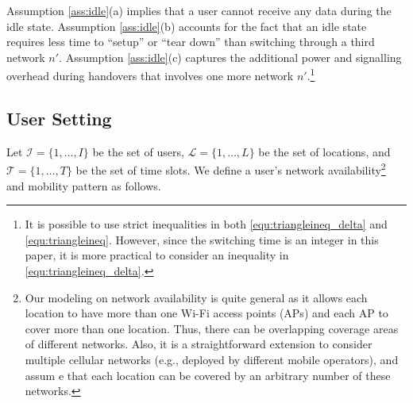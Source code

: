 \documentclass[journal]{IEEEtran}
\begin{document}
 Assumption \ref{ass:idle}(a) implies that a user cannot receive any data during the idle state. 
 Assumption \ref{ass:idle}(b) accounts for the fact that an idle state requires less time to ``setup'' or ``tear down'' than switching through a third network $n'$.
 Assumption \ref{ass:idle}(c) captures the additional power and signalling overhead during handovers that involves one more network $n'$.\footnote{It is possible to use strict inequalities in both \eqref{equ:triangleineq_delta} and \eqref{equ:triangleineq}. However, since the switching time is an integer in this paper, it is more practical to consider an inequality in \eqref{equ:triangleineq_delta}.}



\subsection{User Setting} \label{sec:user}	


  Let $\mathcal{I} = \{1,\ldots,I\}$ be the set of users, $\mathcal{L} = \{1,\ldots,L\}$ be the set of locations, and $\mathcal{T} = \{1,\ldots,T\}$ be the set of time slots. %
  We define a user's network availability\footnote{Our modeling on network availability is quite general as it allows each location to have more than one Wi-Fi access points (APs) and each AP to cover more than one location. Thus, there can be overlapping coverage areas of different networks. Also, it is a straightforward extension to consider multiple cellular networks (e.g., deployed by different mobile operators), and assum e that each location can be covered by an arbitrary number of these networks.} and mobility pattern as follows.
\end{document}
